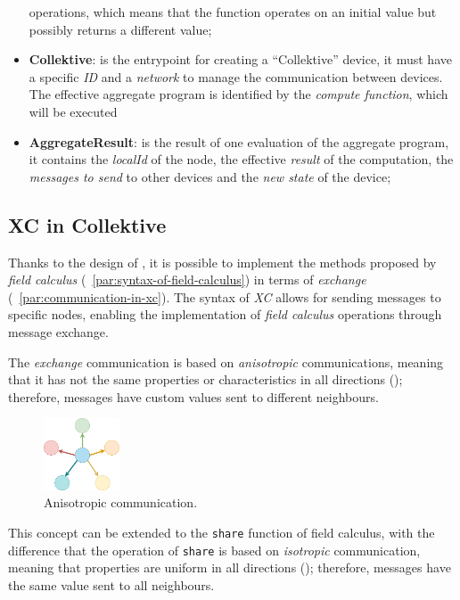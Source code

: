\begin{itemize}
        operations, which means that the function operates on an initial value but possibly returns a different value;
    \item \textbf{Collektive}: is the entrypoint for creating a ``Collektive'' device, it must have a specific \emph{ID} and a
        \emph{network} to manage the communication between devices.
        The effective aggregate program is identified by the \emph{compute function}, which will be executed
    \item \textbf{AggregateResult}: is the result of one evaluation of the aggregate program, it contains the \emph{localId}
        of the node, the effective \emph{result} of the computation, the \emph{messages to send} to other devices and the \emph{new state} of the device;
\end{itemize}

\subsection{XC in Collektive}
\label{subsec:exchange-in-collektive}

Thanks to the design of \xc{}, it is possible to implement the methods proposed by \emph{field calculus}
(~\ref{par:syntax-of-field-calculus}) in terms of \emph{exchange} (~\ref{par:communication-in-xc}).
The syntax of \emph{XC} allows for sending messages to specific nodes, enabling the implementation of \emph{field calculus}
operations through message exchange.

The \emph{exchange} communication is based on \emph{anisotropic} communications, meaning that it has not the same properties
or characteristics in all directions (); therefore, messages have custom values sent to different neighbours.

\begin{figure}[h!]
    \centering
    \includegraphics[width=0.2\textwidth]{figures/anisotropic}
    \caption{Anisotropic communication.}
    \label{fig:anisotropic}
\end{figure}

This concept can be extended to the \texttt{share} function of field calculus, with the difference that the
operation of \texttt{share} is based on \emph{isotropic} communication, meaning that properties are uniform in all directions
(); therefore, messages have the same value sent to all neighbours.

